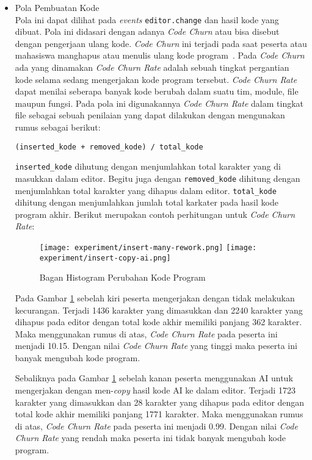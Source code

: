 \begin{itemize}
    \item Pola Pembuatan Kode \\
    Pola ini dapat dilihat pada \textit{events} \verb|editor.change| dan hasil kode yang dibuat. Pola ini didasari dengan adanya \textit{Code Churn} atau bisa disebut dengan pengerjaan ulang kode. \textit{Code Churn} ini terjadi pada saat peserta atau mahasiswa manghapus atau menulis ulang kode program~\cite{hatica:churn}. Pada \textit{Code Churn} ada yang dinamakan \textit{Code Churn Rate} adalah sebuah tingkat pergantian kode selama sedang mengerjakan kode program tersebut. \textit{Code Churn Rate} dapat menilai seberapa banyak kode berubah dalam suatu tim, module, file maupun fungsi. Pada pola ini digunakannya \textit{Code Churn Rate} dalam tingkat file sebagai sebuah penilaian yang dapat dilakukan dengan mengunakan rumus sebagai berikut:
    
    \begin{center}
        \verb|(inserted_kode + removed_kode) / total_kode|
    \end{center}

    \verb|inserted_kode| dihutung dengan menjumlahkan total karakter yang di masukkan dalam editor. Begitu juga dengan \verb|removed_kode| dihitung dengan menjumlahkan total karakter yang dihapus dalam editor. \verb|total_kode| dihitung dengan menjumlahkan jumlah total karkater pada hasil kode program akhir. Berikut merupakan contoh perhitungan untuk \textit{Code Churn Rate}:

    \begin{figure}[H]
        \centering
        \texttt{[image: experiment/insert-many-rework.png]}
        \texttt{[image: experiment/insert-copy-ai.png]}
        \caption{Bagan Histogram Perubahan Kode Program}
        \label{fig:5:2:3:rework}
    \end{figure}

    Pada Gambar \ref{fig:5:2:3:rework} sebelah kiri peserta mengerjakan dengan tidak melakukan kecurangan. Terjadi 1436 karakter yang dimasukkan dan 2240 karakter yang dihapus pada editor dengan total kode akhir memiliki panjang 362 karakter. Maka menggunakan rumus di atas, \textit{Code Churn Rate} pada peserta ini menjadi 10.15. Dengan nilai \textit{Code Churn Rate} yang tinggi maka peserta ini banyak mengubah kode program.
    
    Sebaliknya pada Gambar \ref{fig:5:2:3:rework} sebelah kanan peserta menggunakan AI untuk mengerjakan dengan men-\textit{copy} hasil kode AI ke dalam editor. Terjadi 1723 karakter yang dimasukkan dan 28 karakter yang dihapus pada editor dengan total kode akhir memiliki panjang 1771 karakter. Maka menggunakan rumus di atas, \textit{Code Churn Rate} pada peserta ini menjadi 0.99. Dengan nilai \textit{Code Churn Rate} yang rendah maka peserta ini tidak banyak mengubah kode program.


\end{itemize}
